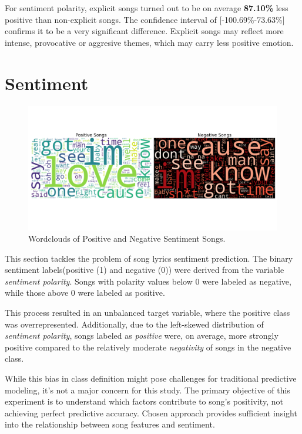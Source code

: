 For sentiment polarity, explicit songs turned out to be on average
\textbf{87.10\%} less positive than non-explicit songs. The confidence interval
of [-100.69\%-73.63\%] confirms it to be a very significant difference.
Explicit songs may reflect more intense, provocative or aggresive themes, which
may carry less positive emotion.


\section{Sentiment}
\label{sec:sentiment}
\begin{center}
\begin{figure}[H]
  \centering
  \includegraphics[width=7in]{img/wordclouds.png}
  \caption{Wordclouds of Positive and Negative Sentiment Songs.}
  \label{Figure:fig_bh}
\end{figure}
\end{center}

This section tackles the problem of song lyrics sentiment prediction. The
binary sentiment labels(positive (1) and negative (0)) were derived from the
variable \textit{sentiment polarity}. Songs with polarity values below 0 were
labeled as negative, while those above 0 were labeled as positive.


This process resulted in an unbalanced target variable, where the positive
class was overrepresented. Additionally, due to the left-skewed distribution of
\textit{sentiment polarity}, songs labeled as \textit{positive} were, on
average, more strongly positive compared to the relatively moderate
\textit{negativity} of songs in the negative class. 

While this bias in class definition might pose challenges for traditional
predictive modeling, it's not a major concern for this study. The primary
objective of this experiment is to understand which factors contribute to
song’s positivity, not achieving perfect predictive accuracy. Chosen approach
provides sufficient insight into the relationship between song features and
sentiment.



